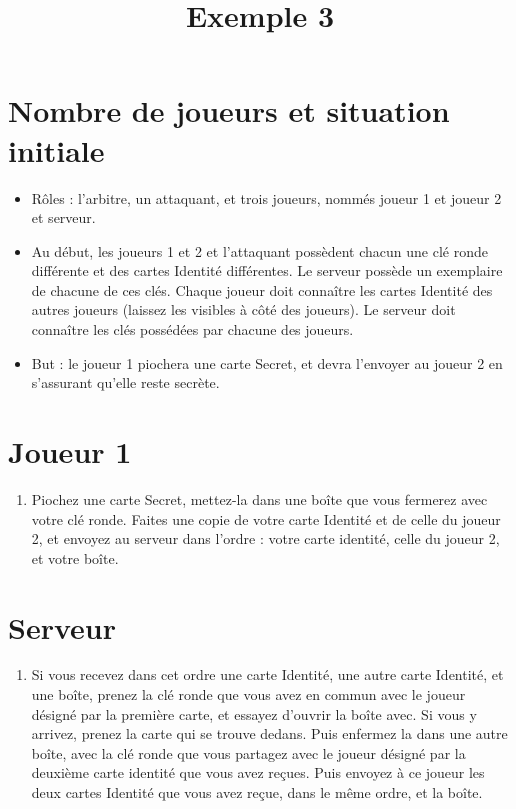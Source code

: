 \documentclass[a4paper,10pt]{article}
\title{Exemple 3}
\date{}
\begin{document}
\maketitle

\section{Nombre de joueurs et situation initiale}
\begin{itemize}
	\item Rôles : l'arbitre, un attaquant, et trois joueurs, nommés joueur 1 et joueur 2 et serveur.
	\item Au début, les joueurs 1 et 2 et l'attaquant possèdent chacun une clé ronde différente et des cartes Identité différentes. Le serveur possède un exemplaire de chacune de ces clés. Chaque joueur doit connaître les cartes Identité des autres joueurs (laissez les visibles à côté des joueurs). Le serveur doit connaître les clés possédées par chacune des joueurs.
	\item But : le joueur 1 piochera une carte Secret, et devra l'envoyer au joueur 2 en s'assurant qu'elle reste secrète.
\end{itemize}




\section{Joueur 1}
\begin{enumerate}
	\item Piochez une carte Secret, mettez-la dans une boîte que vous fermerez avec votre clé ronde. Faites une copie de votre carte Identité et de celle du joueur 2, et envoyez au serveur dans l'ordre : votre carte identité, celle du joueur 2, et votre boîte.
\end{enumerate}

\section{Serveur}
\begin{enumerate}
	\item Si vous recevez dans cet ordre une carte Identité, une autre carte Identité, et une boîte, prenez la clé ronde que vous avez en commun avec le joueur désigné par la première carte, et essayez d'ouvrir la boîte avec. Si vous y arrivez, prenez la carte qui se trouve dedans. Puis enfermez la dans une autre boîte, avec la clé ronde que vous partagez avec le joueur désigné par la deuxième carte identité que vous avez reçues. Puis envoyez à ce joueur les deux cartes Identité que vous avez reçue, dans le même ordre, et la boîte.
\end{enumerate}
\end{document}
